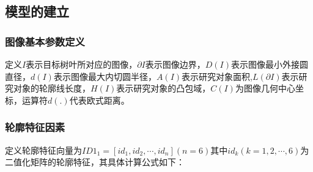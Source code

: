 \documentclass{whutmod}
\begin{document}
	    \subsection{模型的建立}
	    \subsubsection{图像基本参数定义}
		定义$I$表示目标树叶所对应的图像，$\partial I$表示图像边界，$D(I)$表示图像最小外接圆直径，$d(I)$表示图像最大内切圆半径，$A(I)$表示研究对象面积,$L(\partial I)$表示研究对象的轮廓线长度，$H(I)$表示研究对象的凸包域，$C(I)$为图像几何中心坐标，运算符$d(.)$代表欧式距离。
	    \subsubsection{轮廓特征因素}
		定义轮廓特征向量为$ID1_{1}=[id_{1},id_{2},\cdots,id_{n}](n=6)$其中$id_{k}(k=1,2,\cdots,6)$为二值化矩阵的轮廓特征，其具体计算公式如下：
\end{document}

